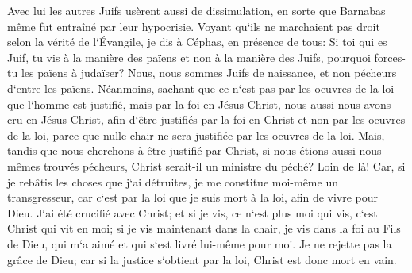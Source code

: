 \verse Avec lui les autres Juifs usèrent aussi de dissimulation, en sorte que Barnabas même fut entraîné par leur hypocrisie. 
\verse Voyant qu`ils ne marchaient pas droit selon la vérité de l`Évangile, je dis à Céphas, en présence de tous: Si toi qui es Juif, tu vis à la manière des païens et non à la manière des Juifs, pourquoi forces-tu les païens à judaïser? 
\verse Nous, nous sommes Juifs de naissance, et non pécheurs d`entre les païens. 
\verse Néanmoins, sachant que ce n`est pas par les oeuvres de la loi que l`homme est justifié, mais par la foi en Jésus Christ, nous aussi nous avons cru en Jésus Christ, afin d`être justifiés par la foi en Christ et non par les oeuvres de la loi, parce que nulle chair ne sera justifiée par les oeuvres de la loi. 
\verse Mais, tandis que nous cherchons à être justifié par Christ, si nous étions aussi nous-mêmes trouvés pécheurs, Christ serait-il un ministre du péché? Loin de là! 
\verse Car, si je rebâtis les choses que j`ai détruites, je me constitue moi-même un transgresseur, 
\verse car c`est par la loi que je suis mort à la loi, afin de vivre pour Dieu. 
\verse J`ai été crucifié avec Christ; et si je vis, ce n`est plus moi qui vis, c`est Christ qui vit en moi; si je vis maintenant dans la chair, je vis dans la foi au Fils de Dieu, qui m`a aimé et qui s`est livré lui-même pour moi. 
\verse Je ne rejette pas la grâce de Dieu; car si la justice s`obtient par la loi, Christ est donc mort en vain. 

